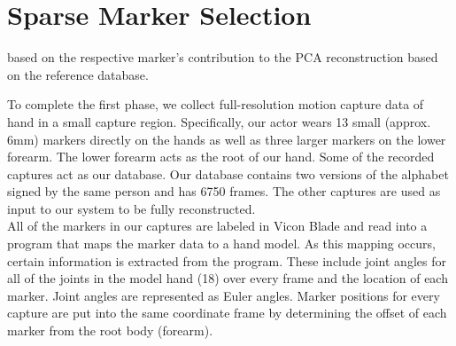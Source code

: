
\section{Sparse Marker Selection}

 based on the respective marker's 
contribution to the PCA reconstruction based on the reference database.


To complete the first phase, we collect full-resolution motion capture 
data of hand in a small capture region. 
Specifically, our actor wears 13 small
(approx. 6mm) markers directly on the hands as well as three larger 
markers on the lower forearm. 
The lower forearm acts as the root of our hand. Some of the recorded 
captures act as our database. Our database contains two versions of the 
alphabet signed by the same person and has 6750 frames. The other 
captures are used as input to our system to be fully reconstructed. \\

All of the markers in our captures are labeled in Vicon Blade and 
read into a program that maps the marker data to a hand model. As 
this mapping occurs, certain information is extracted from the program. 
These include joint angles for all of the joints in the model hand (18) 
over every frame and the location of each marker. Joint angles are 
represented as Euler angles. Marker positions for every capture are 
put into the same coordinate frame by determining the offset of each 
marker from the root body (forearm). \\
